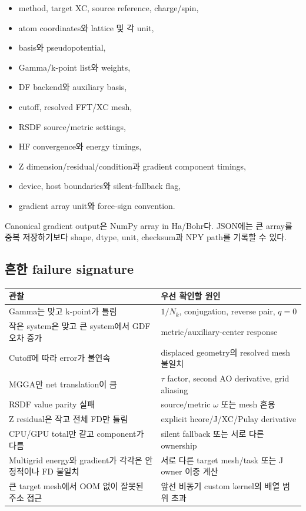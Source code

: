 \begin{itemize}
  \item method, target XC, source reference, charge/spin,
  \item atom coordinates와 lattice 및 각 unit,
  \item basis와 pseudopotential,
  \item Gamma/k-point list와 weights,
  \item DF backend와 auxiliary basis,
  \item cutoff, resolved FFT/XC mesh,
  \item RSDF source/metric settings,
  \item HF convergence와 energy timings,
  \item Z dimension/residual/condition과 gradient component timings,
  \item device, host boundaries와 silent-fallback flag,
  \item gradient array unit와 force-sign convention.
\end{itemize}

Canonical gradient output은 NumPy array in Ha/Bohr다. JSON에는 큰 array를 중복 저장하기보다
shape, dtype, unit, checksum과 NPY path를 기록할 수 있다.

\subsection{흔한 failure signature}

\begin{center}
\begin{longtable}{p{}p{}}
\toprule
관찰 & 우선 확인할 원인 \\
\midrule
Gamma는 맞고 k-point가 틀림 & $1/N_k$, conjugation, reverse pair, $q=0$ \\
작은 system은 맞고 큰 system에서 GDF 오차 증가 & metric/auxiliary-center response \\
Cutoff에 따라 error가 불연속 & displaced geometry의 resolved mesh 불일치 \\
MGGA만 net translation이 큼 & $\tau$ factor, second AO derivative, grid aliasing \\
RSDF value parity 실패 & source/metric $\omega$ 또는 mesh 혼용 \\
Z residual은 작고 전체 FD만 틀림 & explicit hcore/J/XC/Pulay derivative \\
CPU/GPU total만 같고 component가 다름 & silent fallback 또는 서로 다른 ownership \\
Multigrid energy와 gradient가 각각은 안정적이나 FD 불일치 & 서로 다른 target mesh/task 또는 J owner 이중 계산 \\
큰 target mesh에서 OOM 없이 잘못된 주소 접근 & 앞선 비동기 custom kernel의 배열 범위 초과 \\
\bottomrule
\end{longtable}
\end{center}
